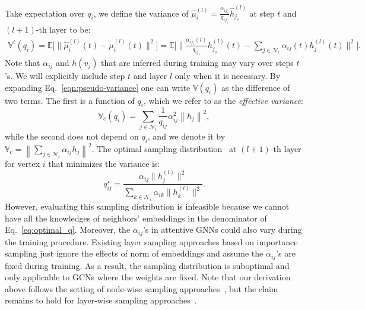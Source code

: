 \documentclass{article}
\begin{document}
Take expectation over $q_i$, we define the variance of 
$\hat{\mu}_i^{(l)}=\frac{\alpha_{ij_s}}{q_{ij_s}}\hat{h}_{j_s}^{(l)}$
at step $t$ and $(l+1)$-th layer to be:
\begin{align}
\label{eqn:pseudo-variance}
\mathbb{V}^{t}(q_i) = \mathbb{E}\Big[\Big\|\hat{\mu}_i^{(l)}(t) - \mu_i^{(l)}(t)\Big\|^2\Big]
=\mathbb{E}\Big[\Big\|\frac{\alpha_{ij_s}(t)}{q_{ij_s}}h_{j_s}^{(l)}(t) - \sum_{j\in \mathcal{N}_i}\alpha_{ij}(t)h_j^{(l)}(t)\Big\|^{2}\Big].
\end{align}
Note that $\alpha_{ij}$ and $h(v_j)$ that are
inferred during training may
vary over steps $t$'s. 
We will explicitly include step $t$ and layer $l$ only 
when it is necessary.
By expanding Eq.~\eqref{eqn:pseudo-variance} one can write 
$\mathbb{V}(q_i)$ as the difference of two terms. The first is a 
function of $q_i$, which we refer to as the 
\textit{effective variance}:
\begin{equation}
\label{eqn:effective-variance}
	\mathbb{V}_{e}(q_i) = \sum_{j \in \mathcal{N}_i}\frac{1}{q_{ij}}\alpha_{ij}^{2}\left\|h_j\right\|^2,
\end{equation}
while the second does not depend on $q_i$, and we denote it by 
$\mathbb{V}_{c} = \left\|\sum_{j\in\mathcal{N}_i}\alpha_{ij}h_j\right\|^2$.
The optimal sampling distribution~\cite{chen2018fastgcn,huang2018adaptive} at $(l+1)$-th layer for vertex $i$ that minimizes the variance is:
\begin{equation}\label{eq:optimal_q}
q_{ij}^{\star} = \frac{\alpha_{ij}\|h_j^{(l)}\|^2}
{\sum_{k \in \mathcal{N}_i} \alpha_{ik} \|h_k^{(l)}\|^2}.
\end{equation}
However, evaluating this sampling distribution is
infeasible because we cannot have all the knowledges
of neighbors' embeddings in the denominator of Eq.~\eqref{eq:optimal_q}. Moreover, the $\alpha_{ij}$'s
in attentive GNNs could also vary during the training
procedure. Existing layer sampling approaches based
on importance sampling just ignore the effects of
norm of embeddings and assume the $\alpha_{ij}$'s are fixed
during training. As a result, the sampling distribution is 
suboptimal and only applicable to GCNs where the weights
are fixed. Note that our derivation above follows the setting
of node-wise sampling approaches~\cite{hamilton2017inductive}, 
but the claim remains to hold for layer-wise 
sampling approaches~\cite{chen2018fastgcn,huang2018adaptive,zou2019layer}.

\begin{comment}
``Layer sampling'' approaches~\cite{chen2018fastgcn,huang2018adaptive} aim to sample neighbors
in a top-down manner, however, it is intractable 
to compute the above optimal sampling distribution 
because it requires evaluating the whole neighbors that are not known a priori,
and the neighbors' embedding $\|h^{(l)}(v_k)\|^2$ 
or even weight $\alpha_{ik}$ in attentive GNNs vary constantly
during the training procedure. FastGCN~\cite{chen2018fastgcn} calculates their
sampling distribution by simply ignoring the norm of neighbors'
embeddings, and AS-GCN~\cite{huang2018adaptive} approximates the neighbors' embeddings
via a linear mapping to the oracle.
\end{comment}
\end{document}
